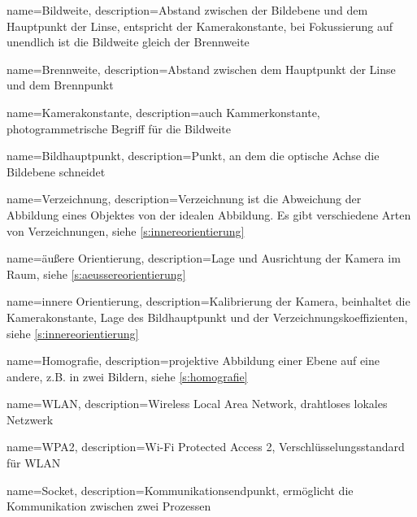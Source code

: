 
{
    name=Bildweite,
    description={Abstand zwischen der Bildebene und dem Hauptpunkt der Linse, entspricht der \Gls{Kamerakonstante}, bei Fokussierung auf unendlich ist die Bildweite gleich der \Gls{Brennweite}}
}

{
    name=Brennweite,
    description={Abstand zwischen dem Hauptpunkt der Linse und dem Brennpunkt}
}

{
    name=Kamerakonstante,
    description={auch Kammerkonstante, photogrammetrische Begriff für die Bildweite}
}

{
    name=Bildhauptpunkt,
    description={Punkt, an dem die optische Achse die Bildebene schneidet}
}

{
    name=Verzeichnung,
    description={Verzeichnung ist die Abweichung der Abbildung eines Objektes von der idealen Abbildung. Es gibt verschiedene Arten von Verzeichnungen, siehe \autoref{s:innereorientierung}
        }
}

{
    name=äußere Orientierung,
    description={Lage und Ausrichtung der Kamera im Raum, siehe \autoref{s:aeussereorientierung}}
}

{
    name=innere Orientierung,
    description={Kalibrierung der Kamera, beinhaltet die \Gls{Kamerakonstante}, Lage des \Gls{Bildhauptpunkt} und der Verzeichnungskoeffizienten, siehe \autoref{s:innereorientierung}}
}

{
    name=Homografie,
    description={projektive Abbildung einer Ebene auf eine andere, z.B. in zwei Bildern, siehe \autoref{s:homografie}}
}


{
    name=WLAN,
    description={Wireless Local Area Network, drahtloses lokales Netzwerk}
}

{
    name=WPA2,
    description={Wi-Fi Protected Access 2, Verschlüsselungsstandard für \Gls{WLAN}}
}

{
    name=Socket,
    description={Kommunikationsendpunkt, ermöglicht die Kommunikation zwischen zwei Prozessen}
}





